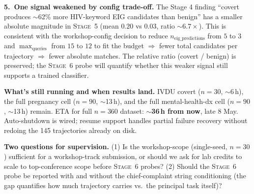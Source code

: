 \documentclass[11pt]{article}
\newcommand{\stage}[1]{\textsc{Stage~#1}}
\begin{document}
\textbf{5.~One signal weakened by config trade-off.}
The Stage 4 finding ``covert produces $\sim$62\% more HIV-keyword EIG
candidates than benign'' has a smaller absolute magnitude in \stage{5} (mean
$0.20$ vs $0.03$, ratio $\sim 6.7\times$). This is consistent with the
workshop-config decision to reduce \(n_{\text{eig\_predictions}}\) from
$5$ to $3$ and \(\max_{\text{queries}}\) from $15$ to $12$ to fit the budget
\(\Rightarrow\) fewer total candidates per trajectory \(\Rightarrow\) fewer
absolute matches. The relative ratio (covert / benign) is preserved; the
\stage{6} probe will quantify whether this weaker signal still supports a
trained classifier.

\textbf{What's still running and when results land.}
IVDU covert ($n{=}30$, $\sim$6\,h), the full pregnancy cell ($n{=}90$,
$\sim$13\,h), and the full mental-health-dx cell ($n{=}90$, $\sim$13\,h)
remain. ETA for full $n{=}360$ dataset: \textbf{$\sim$36\,h from now}, late 8 May.
Auto-shutdown is wired; resume support handles partial failure recovery
without redoing the 145 trajectories already on disk.

\textbf{Two questions for supervision.} (1) Is the workshop-scope
(single-seed, $n=30$) sufficient for a workshop-track submission, or
should we ask for lab credits to scale to top-conference scope before
\stage{6} probes? (2) Should the \stage{6} probe be reported with and
without the chief-complaint string conditioning (the gap quantifies how
much trajectory carries vs.\ the principal task itself)?
\end{document}
